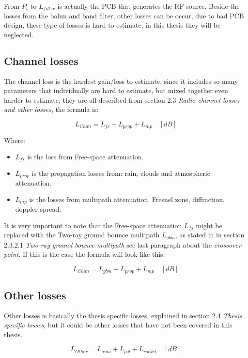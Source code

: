 From $P_t$ to $L_{filter}$ is actually the PCB that generates the RF source. Beside the losses from the balun and band filter, other losses can be occur, due to bad PCB design, these type of losses is hard to estimate, in this thesis they will be neglected.

\subsection{Channel losses}
The channel loss is the hardest gain/loss to estimate, since it includes so many parameters that individually are hard to estimate, but mixed together even harder to estimate, they are all described from section 2.3 \textit{Radio channel losses and other losses}, the formula is:

\begin{equation}
   L_{Chan} = L_{fs}+L_{prop}+L_{mp} \quad [dB]
\end{equation}

Where:

\begin{itemize}
    \item $L_{fs}$ is the loss from Free-space attenuation.
    \item $L_{prop}$ is the propagation losses from: rain, clouds and atmospheric attenuation.
    \item $L_{mp}$ is the losses from multipath attenuation, Fresnel zone, diffraction, doppler spread.
\end{itemize}

It is very important to note that the Free-space attenuation $L_{fs}$ might be replaced with the Two-ray ground bounce multipath $L_{gbm}$, as stated in in section 2.3.2.1 \textit{Two-ray ground bounce multipath} see last paragraph about the \textit{crossover point}. If this is the case the formula will look like this:

\begin{equation}
   L_{Chan} = L_{gbm}+L_{prop}+L_{mp} \quad [dB]
\end{equation}

\subsection{Other losses}
Other losses is basically the thesis specific losses, explained in section 2.4 \textit{Thesis specific losses}, but it could be other losses that have not been covered in this thesis.

\begin{equation}
   L_{Other} = L_{ama}+L_{pol}+L_{rocket} \quad [dB]
\end{equation}

